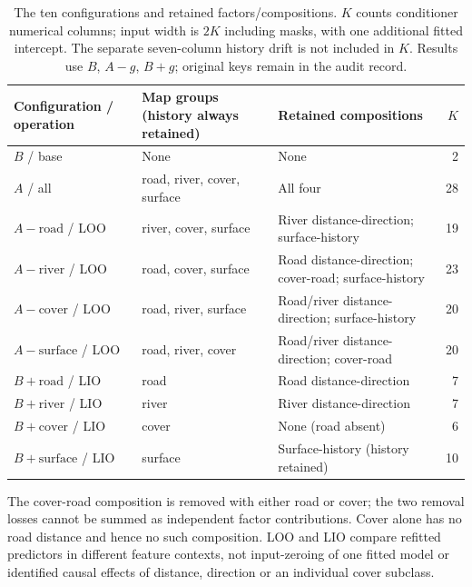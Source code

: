 \begin{table}[!htbp]\centering\small
\caption{The ten configurations and retained factors/compositions. $K$ counts
conditioner numerical columns; input width is $2K$ including masks, with one
additional fitted intercept. The separate seven-column history drift is not
included in $K$. Results use $B$, $A-g$, $B+g$; original keys remain in the audit record.}
\label{tab:main-terrain-configurations}
\begin{tabular}{@{}p{.23\linewidth}p{.28\linewidth}p{.35\linewidth}r@{}}\toprule
Configuration / operation & Map groups (history always retained) & Retained compositions & $K$\\\midrule
$B$ / base & None & None & 2\\
$A$ / all & road, river, cover, surface & All four & 28\\
$A-\mathrm{road}$ / LOO & river, cover, surface & River distance-direction; surface-history & 19\\
$A-\mathrm{river}$ / LOO & road, cover, surface & Road distance-direction; cover-road; surface-history & 23\\
$A-\mathrm{cover}$ / LOO & road, river, surface & Road/river distance-direction; surface-history & 20\\
$A-\mathrm{surface}$ / LOO & road, river, cover & Road/river distance-direction; cover-road & 20\\
$B+\mathrm{road}$ / LIO & road & Road distance-direction & 7\\
$B+\mathrm{river}$ / LIO & river & River distance-direction & 7\\
$B+\mathrm{cover}$ / LIO & cover & None (road absent) & 6\\
$B+\mathrm{surface}$ / LIO & surface & Surface-history (history retained) & 10\\\bottomrule
\end{tabular}\end{table}
The cover-road composition is removed with either road or cover; the two
removal losses cannot be summed as independent factor contributions.
Cover alone has no road distance and hence no such composition. LOO and LIO
compare refitted predictors in different feature contexts, not input-zeroing
of one fitted model or identified causal effects of distance, direction or
an individual cover subclass.
\FloatBarrier
